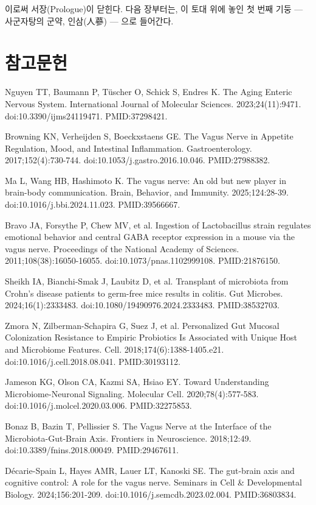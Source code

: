 \documentclass[12pt,oneside]{book}
\newcommand{\refstart}{\par\begingroup\fontsize{8.5pt}{10.2pt}\selectfont\setlength{\parskip}{1.4pt}\raggedright}
\newcommand{\reff}[2]{\par\hangindent=7mm\hangafter=1\noindent[#1]\hspace{2mm}#2\par}
\begin{document}
이로써 서장(Prologue)이 닫힌다. 다음 장부터는, 이 토대 위에 놓인 첫 번째 기둥 — 사군자탕의 군약, 인삼(人蔘) — 으로 들어간다.

\section*{참고문헌}

\refstart

\reff{1}{Nguyen TT, Baumann P, Tüscher O, Schick S, Endres K. The Aging Enteric Nervous System. International Journal of Molecular Sciences. 2023;24(11):9471. doi:10.3390/ijms24119471. PMID:37298421.}

\reff{2}{Browning KN, Verheijden S, Boeckxstaens GE. The Vagus Nerve in Appetite Regulation, Mood, and Intestinal Inflammation. Gastroenterology. 2017;152(4):730-744. doi:10.1053/j.gastro.2016.10.046. PMID:27988382.}

\reff{3}{Ma L, Wang HB, Hashimoto K. The vagus nerve: An old but new player in brain-body communication. Brain, Behavior, and Immunity. 2025;124:28-39. doi:10.1016/j.bbi.2024.11.023. PMID:39566667.}

\reff{4}{Bravo JA, Forsythe P, Chew MV, et al. Ingestion of Lactobacillus strain regulates emotional behavior and central GABA receptor expression in a mouse via the vagus nerve. Proceedings of the National Academy of Sciences. 2011;108(38):16050-16055. doi:10.1073/pnas.1102999108. PMID:21876150.}

\reff{5}{Sheikh IA, Bianchi-Smak J, Laubitz D, et al. Transplant of microbiota from Crohn's disease patients to germ-free mice results in colitis. Gut Microbes. 2024;16(1):2333483. doi:10.1080/19490976.2024.2333483. PMID:38532703.}

\reff{6}{Zmora N, Zilberman-Schapira G, Suez J, et al. Personalized Gut Mucosal Colonization Resistance to Empiric Probiotics Is Associated with Unique Host and Microbiome Features. Cell. 2018;174(6):1388-1405.e21. doi:10.1016/j.cell.2018.08.041. PMID:30193112.}

\reff{7}{Jameson KG, Olson CA, Kazmi SA, Hsiao EY. Toward Understanding Microbiome-Neuronal Signaling. Molecular Cell. 2020;78(4):577-583. doi:10.1016/j.molcel.2020.03.006. PMID:32275853.}

\reff{8}{Bonaz B, Bazin T, Pellissier S. The Vagus Nerve at the Interface of the Microbiota-Gut-Brain Axis. Frontiers in Neuroscience. 2018;12:49. doi:10.3389/fnins.2018.00049. PMID:29467611.}

\reff{9}{Décarie-Spain L, Hayes AMR, Lauer LT, Kanoski SE. The gut-brain axis and cognitive control: A role for the vagus nerve. Seminars in Cell \& Developmental Biology. 2024;156:201-209. doi:10.1016/j.semcdb.2023.02.004. PMID:36803834.}
\end{document}
